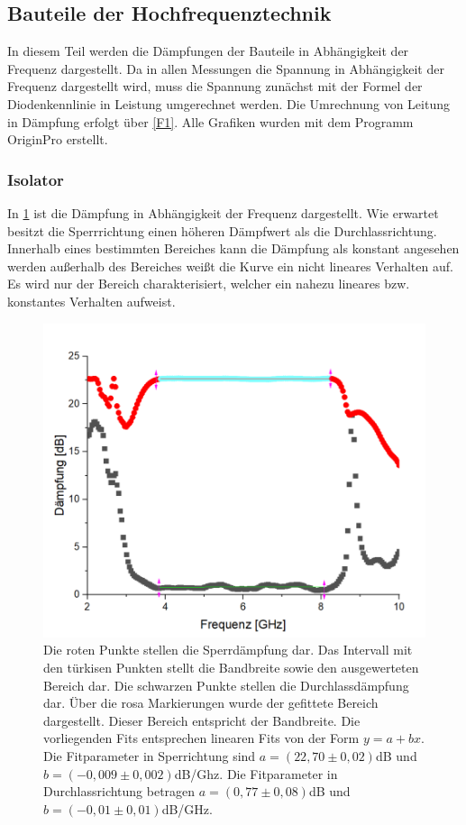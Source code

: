 \subsection{Bauteile der Hochfrequenztechnik}
In diesem Teil werden die Dämpfungen der Bauteile in Abhängigkeit der Frequenz dargestellt. Da in allen Messungen die Spannung in Abhängigkeit der Frequenz dargestellt wird, muss die Spannung zunächst mit der Formel der Diodenkennlinie in Leistung umgerechnet werden. Die Umrechnung von Leitung in Dämpfung erfolgt über \cref{F1}. Alle Grafiken wurden mit dem Programm OriginPro erstellt.
\subsubsection{Isolator}
In \cref{Isolator} ist die Dämpfung in Abhängigkeit der Frequenz dargestellt. Wie erwartet besitzt die Sperrrichtung einen höheren Dämpfwert als die Durchlassrichtung. Innerhalb eines bestimmten Bereiches kann die Dämpfung als konstant angesehen werden außerhalb des Bereiches weißt die Kurve ein nicht lineares Verhalten auf. Es wird nur der Bereich charakterisiert, welcher ein nahezu lineares bzw. konstantes Verhalten aufweist.
\begin{figure}[h!]
	\centering
	\includegraphics[scale = 1]{Isolator11.png}
	\caption{Die roten Punkte stellen die Sperrdämpfung dar. Das Intervall mit den türkisen Punkten stellt die Bandbreite sowie den ausgewerteten Bereich dar. Die schwarzen Punkte stellen die Durchlassdämpfung dar. Über die rosa Markierungen wurde der gefittete Bereich dargestellt. Dieser Bereich entspricht der Bandbreite. Die vorliegenden Fits entsprechen linearen Fits von der Form $y = a + bx$. Die Fitparameter in Sperrichtung sind $a = (22,70 \pm 0,02)$dB und $b = (-0,009 \pm 0,002)$dB/Ghz. Die Fitparameter in Durchlassrichtung betragen $a = (0,77 \pm 0,08)$dB und $b = (-0,01 \pm 0,01)$dB/GHz.}
	\label{Isolator}
\end{figure}
